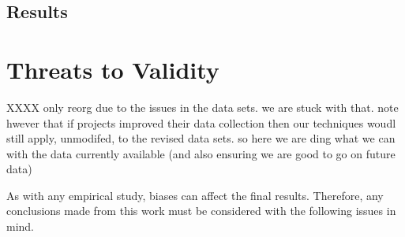 \documentclass{sig-alternate}
\newcommand{\fig}[1]{Figure~\ref{fig:#1}}
\begin{document}
\begin{itemize}
\subsection{Results}

% 
% 

\section{Threats to Validity}\label{sect:valid}

XXXX only reorg due to the issues in the data sets.
we are stuck with that. note hwever that if
projects improved their data collection then
our techniques woudl still apply, unmodifed, to the revised data sets. so here we are ding what we can with the data currently available (and also ensuring we are good to go on future data)


As with any empirical study, biases can affect the final results. Therefore, any
conclusions made from this work must be considered with the following issues in
mind.

 


\end{itemize}
\end{document}

